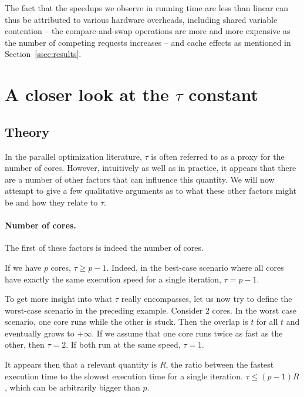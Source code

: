 \documentclass[twoside]{article}
\newcommand{\overlap}{\tau}
\begin{document}
The fact that the speedups we observe in running time are less than linear can thus be attributed to various hardware overheads, including shared variable contention -- the compare-and-swap operations are more and more expensive as the number of competing requests increases -- and cache effects as mentioned in Section~\ref{ssec:results}.

\section{A closer look at the $\overlap$ constant} \label{apxD}
\subsection{Theory}
In the parallel optimization literature, $\overlap$ is often referred to as a proxy for the number of cores.
However, intuitively as well as in practice, it appears that there are a number of other factors that can influence this quantity.
We will now attempt to give a few qualitative arguments as to what these other factors might be and how they relate to $\overlap$.

\paragraph{Number of cores.}
The first of these factors is indeed the number of cores. 

If we have $p$ cores, $\overlap \geq p - 1$.
Indeed, in the best-case scenario where all cores have exactly the same execution speed for a single iteration, $\overlap = p -1$.

To get more insight into what $\overlap$ really encompasses, let us now try to define the worst-case scenario in the preceding example.
Consider $2$ cores. 
In the worst case scenario, one core runs while the other is stuck. 
Then the overlap is $t$ for all $t$ and eventually grows to $+\infty$. 
If we assume that one core runs twice as fast as the other, then $\overlap = 2$. 
If both run at the same speed, $\overlap = 1$.

It appears then that a relevant quantity is $R$, the ratio between the fastest execution time to the slowest execution time for a single iteration. 
$\overlap \leq (p-1) R$, which can be arbitrarily bigger than $p$.
\end{document}
